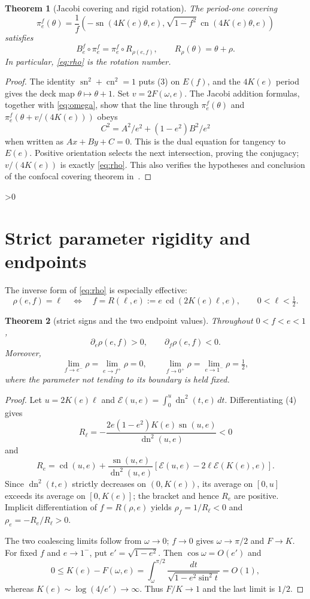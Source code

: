 \documentclass[10pt]{article}
\providecommand{\CRevisionRound}{2}
\newtheorem{theorem}{Theorem}
\newcommand{\sn}{\operatorname{sn}}
\newcommand{\cn}{\operatorname{cn}}
\newcommand{\dn}{\operatorname{dn}}
\newcommand{\cd}{\operatorname{cd}}
\begin{document}
\begin{theorem}[Jacobi covering and rigid rotation]
The period-one covering
\begin{equation}
 \pi_e^f(\theta)=\frac1f\left(
 -\sn(4K(e)\theta,e),
 \sqrt{1-f^2}\,\cn(4K(e)\theta,e)\right)                 \tag{3}
\end{equation}
satisfies
\[
 B_e^f\circ\pi_e^f=\pi_e^f\circ R_{\rho(e,f)},
 \qquad R_\rho(\theta)=\theta+\rho.
\]
In particular, \eqref{eq:rho} is the rotation number.
\end{theorem}
\begin{proof}
The identity $\sn^2+\cn^2=1$ puts (3) on $E(f)$, and the $4K(e)$
period gives the deck map $\theta\mapsto\theta+1$.  Set
$v=2F(\omega,e)$.  The Jacobi addition formulas, together with
\eqref{eq:omega}, show that the line through $\pi_e^f(\theta)$ and
$\pi_e^f(\theta+v/(4K(e)))$ obeys
\[
 C^2=A^2/e^2+(1-e^2)B^2/e^2
\]
when written as $Ax+By+C=0$.  This is the dual equation for tangency to
$E(e)$.  Positive orientation selects the next intersection, proving the
conjugacy; $v/(4K(e))$ is exactly \eqref{eq:rho}.  This also verifies the
hypotheses and conclusion of the confocal covering theorem in~\cite{LM}.
\end{proof}

\ifnum\CRevisionRound>0
\section{Strict parameter rigidity and endpoints}
The inverse form of \eqref{eq:rho} is especially effective:
\begin{equation}
 \rho(e,f)=\ell\quad\Longleftrightarrow\quad
 f=R(\ell,e):=e\,\cd(2K(e)\ell,e),
 \qquad 0<\ell<\tfrac12.                                \tag{4}
\end{equation}

\begin{theorem}[strict signs and the two endpoint values]
Throughout $0<f<e<1$,
\[
 \partial_e\rho(e,f)>0,\qquad \partial_f\rho(e,f)<0.
\]
Moreover,
\[
 \lim_{f\to e^-}\rho=\lim_{e\to f^+}\rho=0,
 \qquad
 \lim_{f\to0^+}\rho=\lim_{e\to1^-}\rho=\tfrac12,
\]
where the parameter not tending to its boundary is held fixed.
\end{theorem}
\begin{proof}
Let $u=2K(e)\ell$ and
$\mathcal E(u,e)=\int_0^u\dn^2(t,e)\,dt$.  Differentiating (4) gives
\[
 R_\ell=-\frac{2e(1-e^2)K(e)\sn(u,e)}{\dn^2(u,e)}<0
\]
and
\[
 R_e=\cd(u,e)+\frac{\sn(u,e)}{\dn^2(u,e)}
 [\mathcal E(u,e)-2\ell\mathcal E(K(e),e)].
\]
Since $\dn^2(t,e)$ strictly decreases on $(0,K(e))$, its average on
$[0,u]$ exceeds its average on $[0,K(e)]$; the bracket and hence $R_e$
are positive.  Implicit differentiation of $f=R(\rho,e)$ yields
$\rho_f=1/R_\ell<0$ and $\rho_e=-R_e/R_\ell>0$.

The two coalescing limits follow from $\omega\to0$; $f\to0$ gives
$\omega\to\pi/2$ and $F\to K$.  For fixed $f$ and $e\to1^-$, put
$e'=\sqrt{1-e^2}$.  Then $\cos\omega=O(e')$ and
\[
 0\le K(e)-F(\omega,e)=
 \int_\omega^{\pi/2}\frac{dt}{\sqrt{1-e^2\sin^2t}}=O(1),
\]
whereas $K(e)\sim\log(4/e')\to\infty$.  Thus $F/K\to1$ and the last
limit is $1/2$.
\end{proof}
\end{document}
